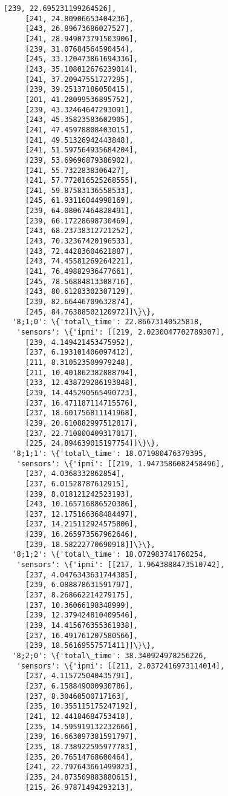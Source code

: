\documentclass[11pt]{article}
\begin{document}
\begin{tcolorbox}[breakable, size=fbox, boxrule=.5pt, pad at break*=1mm, opacityfill=0]
\begin{Verbatim}[commandchars=\\\{\}]
     [239, 22.695231199264526],
     [241, 24.80906653404236],
     [243, 26.89673686027527],
     [241, 28.949073791503906],
     [239, 31.07684564590454],
     [245, 33.120473861694336],
     [243, 35.108012676239014],
     [241, 37.20947551727295],
     [239, 39.25137186050415],
     [201, 41.28099536895752],
     [239, 43.32464647293091],
     [243, 45.35823583602905],
     [241, 47.45978808403015],
     [241, 49.51326942443848],
     [241, 51.597564935684204],
     [239, 53.69696879386902],
     [241, 55.7322838306427],
     [241, 57.772016525268555],
     [241, 59.87583136558533],
     [245, 61.93116044998169],
     [239, 64.08067464828491],
     [239, 66.17228698730469],
     [243, 68.23738312721252],
     [243, 70.32367420196533],
     [243, 72.44283604621887],
     [243, 74.45581269264221],
     [241, 76.49882936477661],
     [245, 78.56884813308716],
     [243, 80.61283302307129],
     [239, 82.66446709632874],
     [245, 84.76388502120972]]\}\},
  '8;1;0': \{'total\_time': 22.86673140525818,
   'sensors': \{'ipmi': [[219, 2.0230047702789307],
     [239, 4.149421453475952],
     [237, 6.193101406097412],
     [211, 8.310523509979248],
     [211, 10.401862382888794],
     [233, 12.438729286193848],
     [239, 14.445290565490723],
     [237, 16.471187114715576],
     [237, 18.601756811141968],
     [239, 20.610882997512817],
     [237, 22.710800409317017],
     [225, 24.894639015197754]]\}\},
  '8;1;1': \{'total\_time': 18.071980476379395,
   'sensors': \{'ipmi': [[219, 1.9473586082458496],
     [237, 4.0368332862854],
     [237, 6.01528787612915],
     [239, 8.018121242523193],
     [243, 10.165716886520386],
     [237, 12.175166368484497],
     [237, 14.215112924575806],
     [239, 16.265973567962646],
     [239, 18.58222770690918]]\}\},
  '8;1;2': \{'total\_time': 18.072983741760254,
   'sensors': \{'ipmi': [[217, 1.9643888473510742],
     [237, 4.0476343631744385],
     [239, 6.088878631591797],
     [237, 8.268662214279175],
     [237, 10.36066198348999],
     [239, 12.379424810409546],
     [239, 14.415676355361938],
     [237, 16.491761207580566],
     [239, 18.56169557571411]]\}\},
  '8;2;0': \{'total\_time': 38.340924978256226,
   'sensors': \{'ipmi': [[211, 2.0372416973114014],
     [237, 4.115725040435791],
     [237, 6.158849000930786],
     [237, 8.30460500717163],
     [235, 10.355115175247192],
     [241, 12.44184684753418],
     [235, 14.595919132232666],
     [239, 16.663097381591797],
     [235, 18.738922595977783],
     [235, 20.76514768600464],
     [241, 22.797643661499023],
     [235, 24.873509883880615],
     [215, 26.97871494293213],

\end{Verbatim}
\end{tcolorbox}
\end{document}
